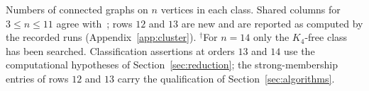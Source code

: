 \begin{landscape}
\begin{table}[h!]
\centering\footnotesize
\caption{Numbers of connected graphs on $n$ vertices in each class. Shared columns for $3\le n\le11$ agree with~\cite[Table~1]{DEFH2023}; rows $12$ and $13$ are new and are reported as computed by the recorded runs (Appendix~\ref{app:cluster}). $^{\dagger}$For $n=14$ only the $K_4$-free class has been searched. Classification assertions at orders $13$ and $14$ use the computational hypotheses of Section~\ref{sec:reduction}; the strong-membership entries of rows $12$ and $13$ carry the qualification of Section~\ref{sec:algorithms}.}\label{tab:card}
\setlength{\tabcolsep}{3pt}
\begin{adjustbox}{max width=\linewidth}\end{adjustbox}
\end{table}
\end{landscape}
